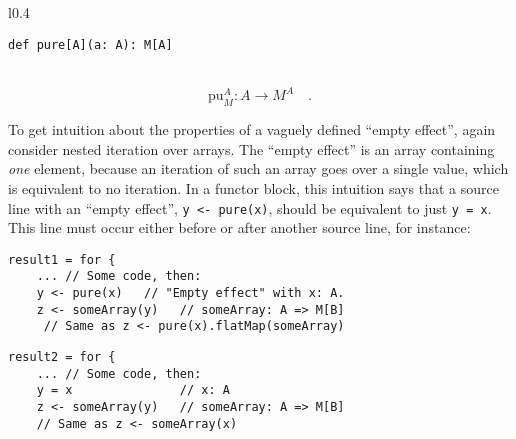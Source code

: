 \begin{wrapfigure}{l}{0.4\columnwidth}%
\vspace{-0.8\baselineskip}
\begin{lstlisting}
def pure[A](a: A): M[A]
\end{lstlisting}
\vspace{-0.6\baselineskip}
\end{wrapfigure}%

~\vspace{-0.5\baselineskip}
\[
\text{pu}_{M}^{A}:A\rightarrow M^{A}\quad.
\]

To get intuition about the properties of a vaguely defined \textsf{``}empty
effect\textsf{''}, again consider nested iteration over arrays. The \textsf{``}empty
effect\textsf{''} is an array containing \emph{one} element, because an iteration
of such an array goes over a single value, which is equivalent to
no iteration. In a functor block, this intuition says that a source
line with an \textsf{``}empty effect\textsf{''}, \lstinline!y <- pure(x)!, should
be equivalent to just \lstinline!y = x!. This line must occur either
before or after another source line, for instance:

\begin{comment}
So, we need to examine two possibilities: first, an empty effect comes
before another source line,
\end{comment}

\noindent \texttt{\textcolor{blue}{\footnotesize{}}}%
\begin{minipage}[c]{0.475\columnwidth}%
\texttt{\textcolor{blue}{\footnotesize{}}}
\begin{lstlisting}
result1 = for {
    ... // Some code, then:
    y <- pure(x)   // "Empty effect" with x: A.
    z <- someArray(y)   // someArray: A => M[B]
     // Same as z <- pure(x).flatMap(someArray)
\end{lstlisting}
%
\end{minipage}\texttt{\textcolor{blue}{\footnotesize{}\hspace*{\fill}}}%
\begin{minipage}[c]{0.475\columnwidth}%
\texttt{\textcolor{blue}{\footnotesize{}}}
\begin{lstlisting}
result2 = for {
    ... // Some code, then:
    y = x               // x: A
    z <- someArray(y)   // someArray: A => M[B]
    // Same as z <- someArray(x)
\end{lstlisting}
%
\end{minipage}{\footnotesize\par}

